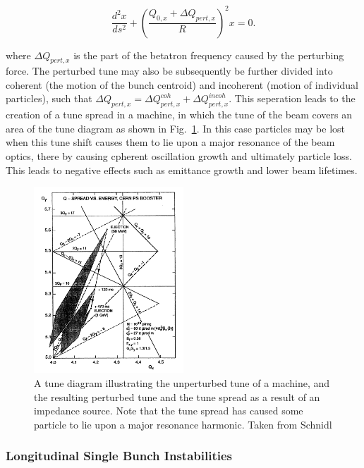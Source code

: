 \begin{equation}
\frac{d^{2}x}{ds^{2}} + \left(\frac{Q_{0,x}+ \Delta Q_{pert,x}}{R}\right)^{2} x = 0.
\end{equation}

where $\Delta Q_{pert,x}$ is the part of the betatron frequency caused by the perturbing force. The perturbed tune may also be subsequently be further divided into coherent (the motion of the bunch centroid) and incoherent (motion of individual particles), such that $\Delta Q_{pert,x} = \Delta Q^{coh}_{pert, x} + \Delta Q^{incoh}_{pert, x}$. This seperation leads to the creation of a tune spread in a machine, in which the tune of the beam covers an area of the tune diagram as shown in Fig.~\ref{fig:tune_diag_tune_shift}. In this case particles may be lost when this tune shift causes them to lie upon a major resonance of the beam optics, there by causing cpherent oscillation growth and ultimately particle loss. This leads to negative effects such as emittance growth and lower beam lifetimes.

\begin{figure}
\begin{center}
\includegraphics[width=0.5\textwidth]{Wakefields_and_Impedances/figures/tune-spread-sc.png}
\end{center}
\caption{A tune diagram illustrating the unperturbed tune of a machine, and the resulting perturbed tune and the tune spread as a result of an impedance source. Note that the tune spread has caused some particle to lie upon a major resonance harmonic. Taken from Schnidl}
\label{fig:tune_diag_tune_shift}
\end{figure}

\subsubsection{Longitudinal Single Bunch Instabilities}

